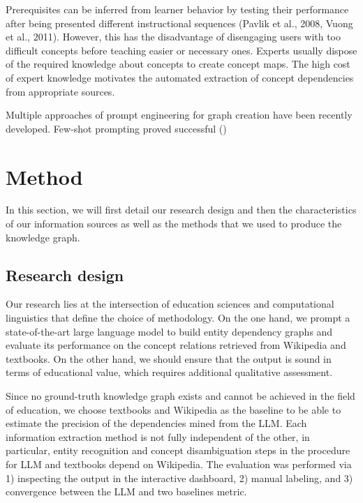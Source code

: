 \documentclass{article}
\begin{document}
Prerequisites can be inferred from learner behavior by testing their performance after being presented different instructional sequences (Pavlik et al., 2008, Vuong et al., 2011). However, this has the disadvantage of disengaging users with too difficult concepts before teaching easier or necessary ones. Experts usually dispose of the required knowledge about concepts to create concept maps. The high cost of expert knowledge motivates the automated extraction of concept dependencies from appropriate sources.



Multiple approaches of prompt engineering for graph creation have been recently developed. Few-shot prompting proved successful (\cite{cohen2023crawling})


\section{Method}
In this section, we will first detail our research design and then the characteristics of our information sources as well as the methods that we used to produce the knowledge graph. 

\subsection{Research design} 

Our research lies at the intersection of education sciences and computational linguistics that define the choice of methodology. On the one hand, we prompt a state-of-the-art large language model to build entity dependency graphs and evaluate its performance on the concept relations retrieved from Wikipedia and textbooks. On the other hand, we should ensure that the output is sound in terms of educational value, which requires additional qualitative assessment.

Since no ground-truth knowledge graph exists and cannot be achieved in the field of education, we choose textbooks and Wikipedia as the baseline to be able to estimate the precision of the dependencies mined from the LLM. Each information extraction method is not fully independent of the other, in particular, entity recognition and concept disambiguation steps in the procedure for LLM and textbooks depend on Wikipedia. The evaluation was performed via 1) inspecting the output in the interactive dashboard, 2) manual labeling, and 3) convergence between the LLM and two baselines metric.
\end{document}
